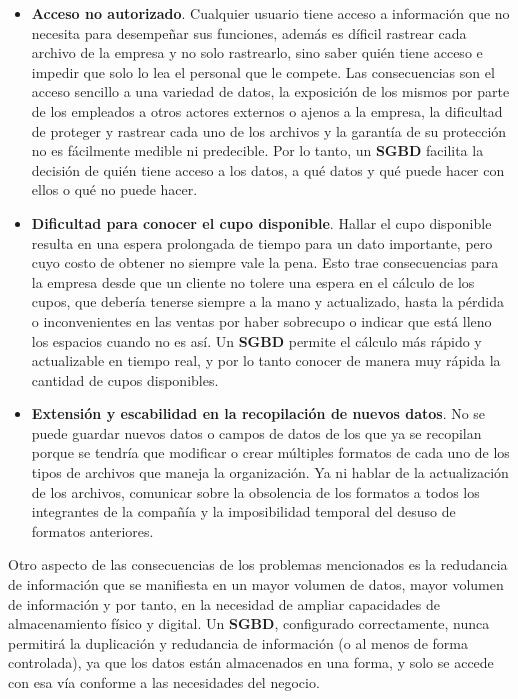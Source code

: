 \documentclass[12pt]{article}
\begin{document}
\begin{itemize}
	\item \textbf{Acceso no autorizado}. Cualquier usuario tiene acceso a información que no necesita para desempeñar sus funciones, además es díficil rastrear cada archivo de la empresa y no solo rastrearlo, sino saber quién tiene acceso e impedir que solo lo lea el personal que le compete. Las consecuencias son el acceso sencillo a una variedad de datos, la exposición de los mismos por parte de los empleados a otros actores externos o ajenos a la empresa, la dificultad de proteger y rastrear cada uno de los archivos y la garantía de su protección no es fácilmente medible ni predecible. Por lo tanto, un \textbf{SGBD} facilita la decisión de quién tiene acceso a los datos, a qué datos y qué puede hacer con ellos o qué no puede hacer.
	\item \textbf{Dificultad para conocer el cupo disponible}. Hallar el cupo disponible resulta en una espera prolongada de tiempo para un dato importante, pero cuyo costo de obtener no siempre vale la pena. Esto trae consecuencias para la empresa desde que un cliente no tolere una espera en el cálculo de los cupos, que debería tenerse siempre a la mano y actualizado, hasta la pérdida o inconvenientes en las ventas por haber sobrecupo o indicar que está lleno los espacios cuando no es así. Un \textbf{SGBD} permite el cálculo más rápido y actualizable en tiempo real, y por lo tanto conocer de manera muy rápida la cantidad de cupos disponibles.
	\item \textbf{Extensión y escabilidad en la recopilación de nuevos datos}. No se puede guardar nuevos datos o campos de datos de los que ya se recopilan porque se tendría que modificar o crear múltiples formatos de cada uno de los tipos de archivos que maneja la organización. Ya ni hablar de la actualización de los archivos, comunicar sobre la obsolencia de los formatos a todos los integrantes de la compañía y la imposibilidad temporal del desuso de formatos anteriores.
\end{itemize}

Otro aspecto de las consecuencias de los problemas mencionados es la redudancia de información que se manifiesta en un mayor volumen de datos, mayor volumen de información y por tanto, en la necesidad de ampliar capacidades de almacenamiento físico y digital. Un \textbf{SGBD}, configurado correctamente, nunca permitirá la duplicación y redudancia de información (o al menos de forma controlada), ya que los datos están almacenados en una forma, y solo se accede con esa vía conforme a las necesidades del negocio.
\end{document}
